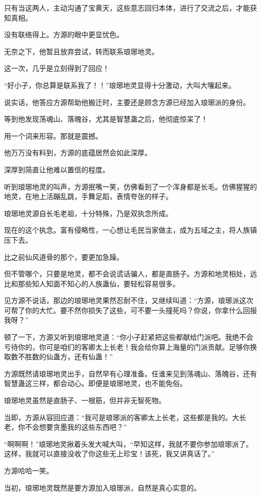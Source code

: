 \begin{this_body}
只有当这两人，主动沟通了宝黄天，这些意志回归本体，进行了交流之后，才能获知真相。

没有联络得上。方源的眼中更显忧色。

无奈之下，他暂且放弃尝试，转而联系琅琊地灵。

这一次，几乎是立刻得到了回应！

“好小子，你总算是联系我了！！”琅琊地灵显得十分激动，大叫大嚷起来。

说实话，他答应方源帮助他搬迁时，主要还是顾念方源已经加入琅琊派的身份。

等到他发现荡魂山、落魄谷，尤其是智慧蛊之后，他彻底惊呆了！

用一个词来形容。那就是震撼。

他万万没有料到，方源的底蕴居然会如此深厚。

深厚到简直让他难以置信的程度。

听到琅琊地灵的叫声，方源抿嘴一笑，仿佛看到了一个浑身都是长毛。仿佛猩猩的地灵，在地上活蹦乱跳，手舞足蹈，表情夸张的样子。

琅琊地灵源自长毛老祖，十分特殊，乃是双执念所成。

现在的这个执念。富有侵略性，一心想让毛民当家做主，成为五域之主，将人族镇压下去。

比之前仙风道骨的那个，要更加急躁。

但不管哪个，只要是地灵，都不会说谎话骗人，都是直肠子。方源和地灵相处，远比和那些知人知面不知心的人族蛊仙，要轻松容易很多。

见方源不说话，那边的琅琊地灵果然忍耐不住，又继续叫道：“方源，琅琊派这次可帮了你的大忙。要不然你损失了这些，可不要一头撞死吗？你说，你拿什么回报我呀？”

顿了一下，方源又听到琅琊地灵道：“你小子赶紧把这些都献给门派吧。我绝不会亏待你的，你可是咱们的客卿太上长老！我会给你算上海量的门派贡献。足够你换取数不胜数的仙蛊方，还有仙蛊！”

方源既然请琅琊地灵出手，自然早有心理准备。任谁来见到荡魂山、落魄谷，还有智慧蛊这三样，都会动心。即便是琅琊地灵，也不能免俗。

琅琊地灵虽然是直肠子、一根筋，但并非无智死物。

当即，方源从容回应道：“我可是琅琊派的客卿太上长老，这些都是我的。大长老，你不会想要贪墨我的这些东西吧？”

“啊啊啊！”琅琊地灵揪着头发大喊大叫，“早知这样，我就不要你参加琅琊派了。这样，我就可以直接没收了你这些无上珍宝！该死，我又讲真话了。”

方源哈哈一笑。

当初，琅琊地灵既然是要方源加入琅琊派，自然是真心实意的。


\end{this_body}
